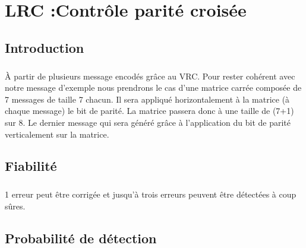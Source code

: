 
\chapter{LRC :Contrôle parité croisée}

    \section{Introduction}

        \paragraph{}
À partir de plusieurs message encodés grâce au VRC.
Pour rester cohérent avec notre message d'exemple nous prendrons le cas d'une matrice carrée composée de 7 messages de taille 7 chacun.
Il sera appliqué horizontalement à la matrice (à chaque message) le bit de parité.
La matrice passera donc à une taille de (7+1) sur 8.
Le dernier message qui sera généré grâce à l'application du bit de parité verticalement sur la matrice.


    \clearpage

    \section{Fiabilité}

        \paragraph{}
1 erreur peut être corrigée et jusqu’à trois erreurs peuvent être détectées à coup sûres.


    \section{Probabilité de détection}

